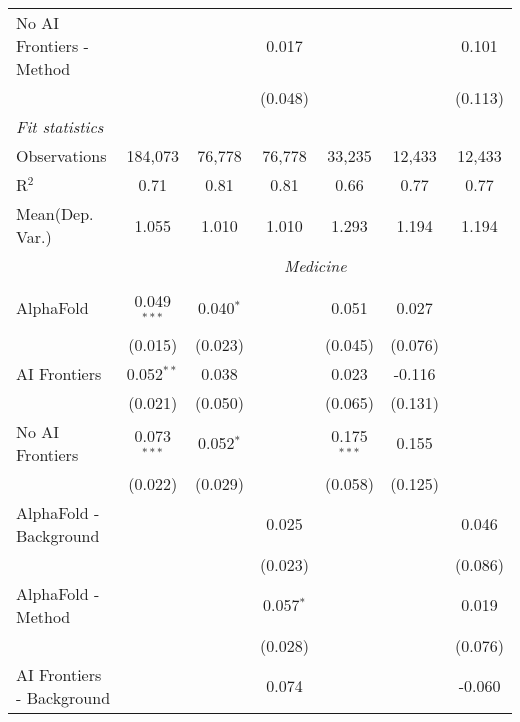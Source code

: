 \begin{tabular}{lcccccc}
   No AI Frontiers - Method     &               &             & 0.017        &               &             & 0.101\\   
                                &               &             & (0.048)      &               &             & (0.113)\\   
   \midrule
   \emph{Fit statistics}\\
   Observations                 & 184,073       & 76,778      & 76,778       & 33,235        & 12,433      & 12,433\\  
   R$^2$                        & 0.71          & 0.81        & 0.81         & 0.66          & 0.77        & 0.77\\  
   
Mean(Dep. Var.) & 1.055 & 1.010 & 1.010 & 1.293 & 1.194 & 1.194 \\
 & \multicolumn{6}{c}{\textit{Medicine}} \\ \\
   AlphaFold                    & 0.049$^{***}$ & 0.040$^{*}$ &               & 0.051         & 0.027   &   \\   
                                & (0.015)       & (0.023)     &               & (0.045)       & (0.076) &   \\   
   AI Frontiers                 & 0.052$^{**}$  & 0.038       &               & 0.023         & -0.116  &   \\   
                                & (0.021)       & (0.050)     &               & (0.065)       & (0.131) &   \\   
   No AI Frontiers              & 0.073$^{***}$ & 0.052$^{*}$ &               & 0.175$^{***}$ & 0.155   &   \\   
                                & (0.022)       & (0.029)     &               & (0.058)       & (0.125) &   \\   
   AlphaFold - Background       &               &             & 0.025         &               &         & 0.046\\   
                                &               &             & (0.023)       &               &         & (0.086)\\   
   AlphaFold - Method           &               &             & 0.057$^{*}$   &               &         & 0.019\\   
                                &               &             & (0.028)       &               &         & (0.076)\\   
   AI Frontiers - Background    &               &             & 0.074         &               &         & -0.060\\   

\end{tabular}

